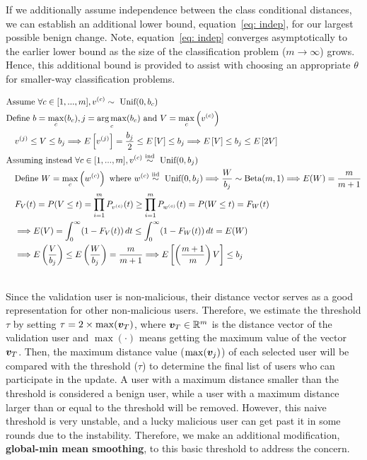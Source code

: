 \documentclass{article} %
\begin{document}
If we additionally assume independence between the class conditional distances, we can establish an additional lower bound, equation~\ref{eq: indep}, for our largest possible benign change. Note, equation~\ref{eq: indep} converges asymptotically to the earlier lower bound as the size of the classification problem ($m \rightarrow \infty$) grows. Hence, this additional bound is provided to assist with choosing an appropriate $\theta$ for smaller-way classification problems.

\begin{align}
    & \textrm{Assume } \forall c \in [1,...,m], v^{(c)} \sim \textrm{ Unif}(0, b_c) \nonumber \\
    & \textrm{Define } b = \max_c (b_c), j = \operatorname*{arg\,max}_c (b_c) \textrm{ and } V = \max_c \left( v^{(c)} \right) \nonumber \\
    & \quad v^{(j)} \leq V \leq b_j \Longrightarrow E \left[ v^{(j)} \right] = \dfrac{b_j}{2} \leq E \left[ V \right] \leq b_j  \Longrightarrow E \left[ V \right] \leq b_j \leq E \left[ 2 V \right] \label{eq: dep} \\
    & \textrm{Assuming instead } \forall c \in [1,...,m], v^{(c)} \overset{\textrm{ind}}{\sim} \textrm{ Unif}(0, b_j) \nonumber \\
    & \quad \textrm{Define } W = \max_c \left( w^{(c)} \right) \textrm{ where } w^{(c)} \overset{\textrm{iid}}{\sim} \textrm{ Unif}(0, b_j) \Longrightarrow \dfrac{W}{b_j} \sim \textrm{Beta}(m, 1) \Longrightarrow E(W) = \dfrac{m}{m + 1} \nonumber \\
    & \quad F_V(t) = P(V \leq t) = \prod_{i = 1}^m P_{v^{(c)}}(t) \geq \prod_{i = 1}^m P_{w^{(c)}}(t) = P(W \leq t) = F_W(t) \nonumber \\
    & \quad \Longrightarrow E(V) = \int_0^\infty (1 - F_V(t)) \,dt \leq \int_0^\infty (1 - F_W(t)) \,dt = E(W) \nonumber \\
    & \quad \Longrightarrow E \left( \dfrac{V}{b_j} \right) \leq E \left( \dfrac{W}{b_j} \right) = \dfrac{m}{m + 1} \Longrightarrow E \left[ \left( \dfrac{m + 1}{m} \right) V \right] \leq b_j \label{eq: indep} \\
    \nonumber 
\end{align}


Since the validation user is non-malicious, their distance vector serves as a good representation for other non-malicious users. Therefore, we estimate the threshold $\tau$ by setting $\tau=2\times\max({\bm{v}}_T)$, where ${\bm{v}}_T\in{\mathbb{R}}^m$ is the distance vector of the validation user and $\max(\cdot)$ means getting the maximum value of the vector ${\bm{v}}_T$. Then, the maximum distance value ($\max({\bm{v}}_j)$) of each selected user will be compared with the threshold ($\tau$) to determine the final list of users who can participate in the update. A user with a maximum distance smaller than the threshold is considered a benign user, while a user with a maximum distance larger than or equal to the threshold will be removed. However, this naive threshold is very unstable, and a lucky malicious user can get past it in some rounds due to the instability. Therefore, we make an additional modification, {\bf global-min mean smoothing}, to this basic threshold to address the concern.
\end{document}
